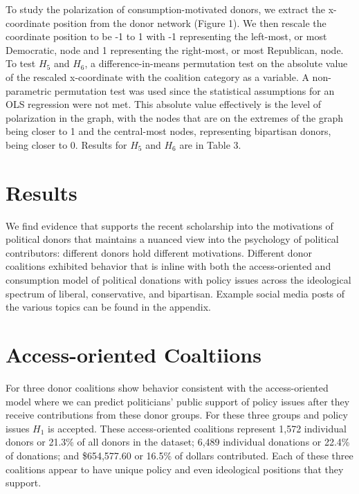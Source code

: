 \documentclass[12pt,]{article}
\begin{document}
To study the polarization of consumption-motivated donors, we extract
the x-coordinate position from the donor network (Figure 1). We then
rescale the coordinate position to be -1 to 1 with -1 representing the
left-most, or most Democratic, node and 1 representing the right-most,
or most Republican, node. To test \(H_{5}\) and \(H_{6}\), a
difference-in-means permutation test on the absolute value of the
rescaled x-coordinate with the coalition category as a variable. A
non-parametric permutation test was used since the statistical
assumptions for an OLS regression were not met. This absolute value
effectively is the level of polarization in the graph, with the nodes
that are on the extremes of the graph being closer to 1 and the
central-most nodes, representing bipartisan donors, being closer to 0.
Results for \(H_{5}\) and \(H_{6}\) are in Table 3.

\hypertarget{results}{%
\section{Results}\label{results}}

We find evidence that supports the recent scholarship into the
motivations of political donors that maintains a nuanced view into the
psychology of political contributors: different donors hold different
motivations. Different donor coalitions exhibited behavior that is
inline with both the access-oriented and consumption model of political
donations with policy issues across the ideological spectrum of liberal,
conservative, and bipartisan. Example social media posts of the various
topics can be found in the appendix.

\hypertarget{access-oriented-coaltiions}{%
\section{Access-oriented Coaltiions}\label{access-oriented-coaltiions}}

For three donor coalitions show behavior consistent with the
access-oriented model where we can predict politicians' public support
of policy issues after they receive contributions from these donor
groups. For these three groups and policy issues \(H_{1}\) is accepted.
These access-oriented coalitions represent 1,572 individual donors or
21.3\% of all donors in the dataset; 6,489 individual donations or
22.4\% of donations; and \$654,577.60 or 16.5\% of dollars contributed.
Each of these three coalitions appear to have unique policy and even
ideological positions that they support.
\end{document}
